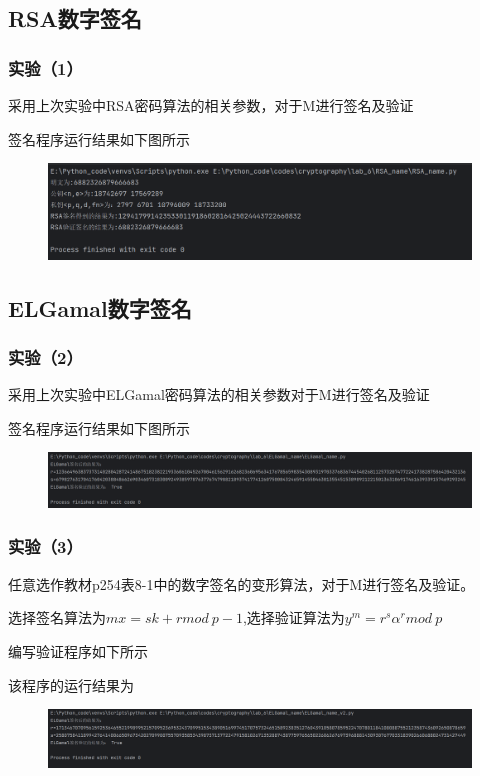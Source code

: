 \documentclass[a4paper,11pt,UTF8]{ctexart}
\newcommand{\bottomcaption}{%
\setlength{\abovecaptionskip}{6pt}%
\setlength{\belowcaptionskip}{6pt}%
\caption}
\newcommand{\xiaowuhao}{\fontsize{9pt}{\baselineskip}\selectfont}   %
\begin{document}
  \subsection{RSA数字签名}
    \subsubsection{实验（1）}
      采用上次实验中RSA密码算法的相关参数，对于M进行签名及验证\par
      签名程序运行结果如下图所示
      \begin{figure}[H]
        \centering
        \includegraphics[width=13cm]{RSA_result.png}
        \bottomcaption{\xiaowuhao{RSA运算结果}}
      \end{figure}

  \subsection{ELGamal数字签名}

    \subsubsection{实验（2）}
      采用上次实验中ELGamal密码算法的相关参数对于M进行签名及验证\par
      签名程序运行结果如下图所示
      \begin{figure}[H]
        \centering
        \includegraphics[width=13cm]{ELGamal_result2.png}
        \bottomcaption{\xiaowuhao{ELGamal运算结果}}
      \end{figure}

    \subsubsection{实验（3）}
      任意选作教材p254表8-1中的数字签名的变形算法，对于M进行签名及验证。\par
      选择签名算法为$mx=sk+r mod \ p-1$,选择验证算法为$y^{m}=r^{s}\alpha^{r}mod\ p$\par
      编写验证程序如下所示
      
      该程序的运行结果为
      \begin{figure}[H]
        \centering
        \includegraphics[width=13cm]{ELGamal_result3.png}
        \bottomcaption{\xiaowuhao{ELGamal变形运算结果}}
      \end{figure}
  
\end{document}

